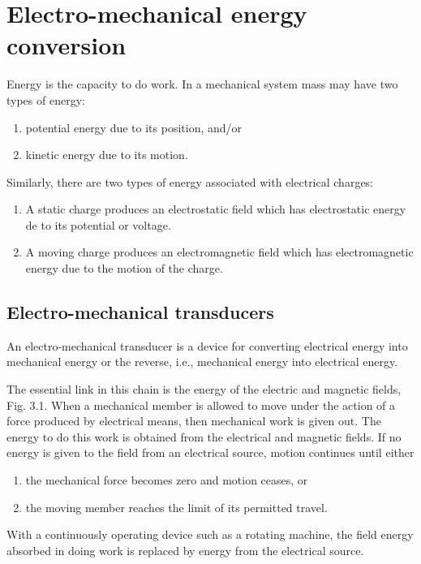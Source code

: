 \documentclass[a4paper,numbers=noenddot,12pt]{scrbook}
\begin{document}
\chapter{Electro-mechanical energy conversion}
Energy is the capacity to do work. In a mechanical system mass may have two types of energy:
\begin{enumerate}[label={(\alph*)}]
    \item potential energy due to its position, and/or
    \item kinetic energy due to its motion.
\end{enumerate}

Similarly, there are two types of energy associated with electrical charges:
\begin{enumerate}[label={(\alph*)},leftmargin=*]
    \item A static charge produces an electrostatic field which has electrostatic energy de to its potential or voltage.
    \item A moving charge produces an electromagnetic field which has electromagnetic energy due to the motion of the charge.
\end{enumerate}

\section{Electro-mechanical transducers}
An electro-mechanical transducer is a device for converting electrical energy into mechanical energy or the reverse, i.e., mechanical energy into electrical energy.

The essential link in this chain is the energy of the electric and magnetic fields, Fig. 3.1. When a mechanical member is allowed to move under the action of a force produced by electrical means, then mechanical work is given out. The energy to do this work is obtained from the electrical and magnetic fields. If no energy is given to the field from an electrical source, motion continues until either
\begin{enumerate}[label={(\alph*)}]
    \item the mechanical force becomes zero and motion ceases, or
    \item the moving member reaches the limit of its permitted travel.
\end{enumerate}

With a continuously operating device such as a rotating machine, the field energy absorbed in doing work is replaced by energy from the electrical source.
\end{document}
